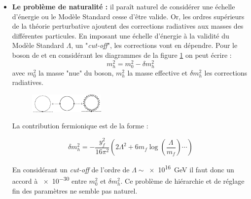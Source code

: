 \begin{itemize}[label=$\bullet$]
\item \textbf{Le problème de naturalité :} il paraît naturel de considérer une échelle d'énergie ou le Modèle Standard cesse d'être valide. Or, les ordres supérieurs de la théorie perturbative ajoutent des corrections radiatives aux masses des différentes particules. En imposant une échelle d'énergie à la validité du Modèle Standard $\Lambda$, un "\textit{cut-off}", les corrections vont en dépendre. Pour le boson de  et en considérant les diagrammes de la figure \ref{corrections} on peut écrire :
\begin{equation}
m_{h}^{2}=m_{0}^{2}-\delta m_{h}^{2}
\end{equation}
avec $m_{0}^{2}$ la masse "nue" du boson, $m_{h}^{2}$ la masse effective et $\delta m_{h}^{2}$ les corrections radiatives.

\begin{figure}[ht!]
\centering
\includegraphics[width=0.35\textwidth]{SM/corrections.jpg}
\label{corrections}
\end{figure}

La contribution fermionique est de la forme :

\begin{equation}
\label{eq1}
\delta m_{h}^{2}=-\frac{y_{f}^{2}}{16\pi^{2}}\left(2\Lambda^{2}+6m_{f}\log\left(\frac{\Lambda}{m_{f}}\right)\cdots\right)
\end{equation}

En considérant un \textit{cut-off} de l'ordre de $\Lambda \sim$\SI{e16}{\giga\eV} il faut donc un accord à \num{e-30} entre $m_{0}^{2}$ et $\delta m_{h}^{2}$. Ce problème de hiérarchie et de réglage fin des paramètres ne semble pas naturel.


\end{itemize}
